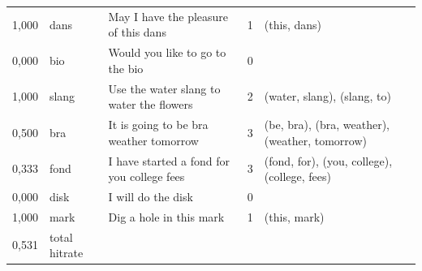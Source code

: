 \documentclass[a4paper,12pt]{article}
\begin{document}
\begin{landscape}
\begin{longtable}{l l l r l}
1,000 & dans & May I have the pleasure of this dans & 1 & (this, dans) \\
0,000 & bio & Would you like to go to the bio & 0 &  \\
1,000 & slang & Use the water slang to water the flowers & 2 & (water, slang), (slang, to) \\
0,500 & bra & It is going to be bra weather tomorrow & 3 & (be, bra), (bra, weather), (weather, tomorrow) \\
0,333 & fond & I have started a fond for you college fees & 3 & (fond, for), (you, college), (college, fees) \\
0,000 & disk & I will do the disk & 0 &  \\
1,000 & mark & Dig a hole in this mark & 1 & (this, mark) \\
\hline
0,531 & total hitrate
\label{tab:resultincorrect}
\end{longtable}
\end{landscape}
\end{document}
